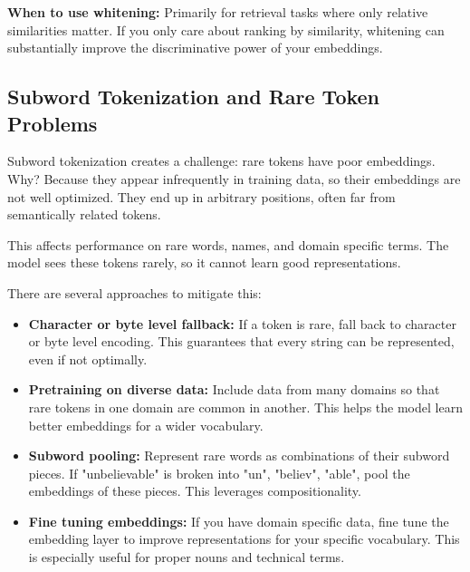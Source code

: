 \vspace{1em}

\textbf{When to use whitening:} Primarily for retrieval tasks where only relative similarities matter. If you only care about ranking by similarity, whitening can substantially improve the discriminative power of your embeddings.

\vspace{1.5em}

\subsection{Subword Tokenization and Rare Token Problems}

Subword tokenization creates a challenge: rare tokens have poor embeddings. Why? Because they appear infrequently in training data, so their embeddings are not well optimized. They end up in arbitrary positions, often far from semantically related tokens.

This affects performance on rare words, names, and domain specific terms. The model sees these tokens rarely, so it cannot learn good representations.

\vspace{1em}

There are several approaches to mitigate this:

\begin{itemize}
\item \textbf{Character or byte level fallback:} If a token is rare, fall back to character or byte level encoding. This guarantees that every string can be represented, even if not optimally.

\item \textbf{Pretraining on diverse data:} Include data from many domains so that rare tokens in one domain are common in another. This helps the model learn better embeddings for a wider vocabulary.

\item \textbf{Subword pooling:} Represent rare words as combinations of their subword pieces. If "unbelievable" is broken into "un", "believ", "able", pool the embeddings of these pieces. This leverages compositionality.

\item \textbf{Fine tuning embeddings:} If you have domain specific data, fine tune the embedding layer to improve representations for your specific vocabulary. This is especially useful for proper nouns and technical terms.
\end{itemize}

